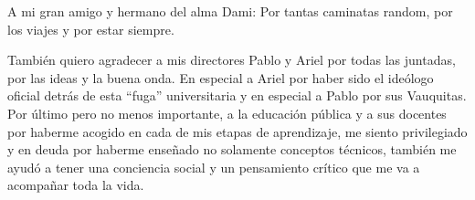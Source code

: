 A mi gran amigo y hermano del alma Dami: Por tantas caminatas random, por los viajes y por estar siempre.

También quiero agradecer a mis directores Pablo y Ariel por todas las juntadas, por las ideas y la buena onda. En especial a Ariel por haber sido el ideólogo oficial detrás de esta ``fuga'' universitaria y en especial a Pablo por sus Vauquitas. 
Por último pero no menos importante, a la educación pública y a sus docentes por haberme acogido en cada de mis etapas de aprendizaje, me siento privilegiado y en deuda por haberme enseñado no solamente conceptos técnicos, también me ayudó a tener una conciencia social y un pensamiento crítico que me va a acompañar toda la vida.















